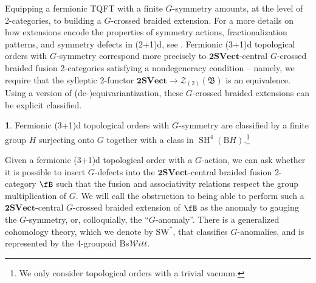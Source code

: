 \documentclass[11pt,reqno]{amsart}
\DeclareMathOperator{\SH}{SH}
\newcommand{\sWitt}{s\mathscr{W}itt}
\newcommand{\rB}{\mathrm{B}}
\numberwithin{equation}{section}
\theoremstyle{plain}
\theoremstyle{definition}
\newtheorem*{FermionicSET}{\Cref{prop:genuinelyfermionicTOclassification}}
\begin{document}
Equipping a fermionic TQFT with a finite $G$-symmetry amounts, at the level of 2-categories, to building a $G$-crossed braided extension. For a more details on how extensions encode the properties of symmetry actions, fractionalization patterns, and symmetry defects in (2+1)d, see \cite{Barkeshli:2014cna,Barkeshli:2019vtb,Bulmash:2020flp,Manjunath:2020kne,Barkeshli:2021ypb}.
Fermionic (3+1)d topological orders with $G$-symmetry correspond more precisely to $\mathbf{2SVect}$-central $G$-crossed braided fusion 2-categories satisfying a nondegeneracy condition -- namely, we require that the sylleptic 2-functor $\mathbf{2SVect}\rightarrow\mathcal{Z}_{(2)}(\mathfrak{B})$ is an equivalence. Using a version of (de-)equivariantization, these $G$-crossed braided extensions can be explicit classified. 

\begin{FermionicSET}\label{thm:GTQFT}
 Fermionic (3+1)d topological orders with $G$-symmetry are classified by a finite group $H$ surjecting onto $G$ together with a class in $\SH^{4}(\rB H)$.\footnote{We only consider topological orders with a trivial vacuum.}
\end{FermionicSET}

Given a fermionic (3+1)d topological order with a $G$-action, we can ask whether it is possible to insert $G$-defects into the $\mathbf{2SVect}$-central braided fusion 2-category $\fB$ such that the fusion and associativity relations
respect the group multiplication of $G$.
We will call the obstruction to being able to perform such a $\mathbf{2SVect}$-central $G$-crossed braided extension of $
\fB$ as the anomaly to gauging the $G$-symmetry, or, colloquially, the ``$G$-anomaly''. There is a generalized cohomology theory, which we denote by $\mathrm{SW}^*$, that classifies $G$-anomalies, and is represented by the 4-groupoid $\rB \sWitt$.
\end{document}
